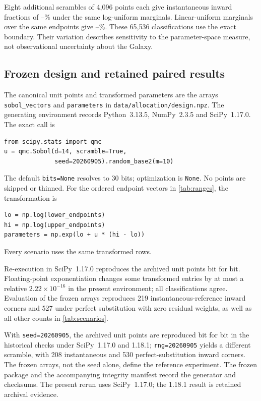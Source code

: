 Eight additional scrambles of 4,096 points each give instantaneous
inward fractions of \DesignLogMin--\DesignLogMax\% under the same
log-uniform marginals. Linear-uniform marginals over the same endpoints
give \DesignLinearMin--\DesignLinearMax\%. These 65,536 classifications
use the exact boundary. Their variation describes sensitivity to the
parameter-space measure, not observational uncertainty about the Galaxy.

\subsection{Frozen design and retained paired results}
\label{supp:legacy-numerical}

The canonical unit points and transformed parameters are the arrays
\texttt{sobol\_vectors} and \texttt{parameters} in
\texttt{data/allocation/design.npz}. The generating environment records
Python~3.13.5, NumPy~2.3.5 and SciPy~1.17.0. The exact call is
\begin{verbatim}
from scipy.stats import qmc
u = qmc.Sobol(d=14, scramble=True,
              seed=20260905).random_base2(m=10)
\end{verbatim}
The default \texttt{bits=None} resolves to 30 bits; optimization is
\texttt{None}. No points are skipped or thinned. For the ordered endpoint
vectors in \cref{tab:ranges}, the transformation is
\begin{verbatim}
lo = np.log(lower_endpoints)
hi = np.log(upper_endpoints)
parameters = np.exp(lo + u * (hi - lo))
\end{verbatim}
Every scenario uses the same transformed rows.

Re-execution in SciPy~1.17.0 reproduces the archived unit points bit for
bit. Floating-point exponentiation changes some transformed entries by
at most a relative $2.22\times10^{-16}$ in the present environment;
all classifications agree. Evaluation of the frozen arrays reproduces
219 instantaneous-reference inward corners and 527 under perfect
substitution with zero residual weights, as well as all other counts
in \cref{tab:scenarios}.

With \texttt{seed=20260905}, the archived unit points are reproduced
bit for bit in the historical checks under SciPy~1.17.0 and 1.18.1;
\texttt{rng=20260905} yields a different scramble, with 208
instantaneous and 530 perfect-substitution inward corners.
The frozen arrays, not the seed alone, define the reference experiment.
The frozen package and the accompanying integrity manifest record the generator and checksums. The present rerun uses SciPy~1.17.0; the 1.18.1 result is retained archival evidence.

